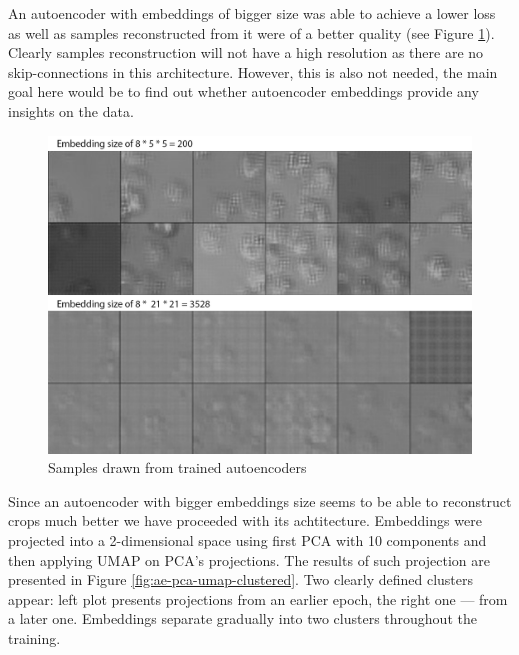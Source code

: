 An autoencoder with embeddings of bigger size was able to achieve a lower loss as well as samples reconstructed from it were of a better quality (see Figure \ref{fig:ae-samples}). Clearly samples reconstruction will not have a high resolution as there are no skip-connections in this architecture. However, this is also not needed, the main goal here would be to find out whether autoencoder embeddings provide any insights on the data.
\begin{figure}[H]
	\begin{center}
		\includegraphics[width=0.5\linewidth]{bilder/ae-embeddings/ae-samples.png}
		\caption{Samples drawn from trained autoencoders}
		\label{fig:ae-samples}
	\end{center}
\end{figure}

Since an autoencoder with bigger embeddings size seems to be able to reconstruct crops much better we have proceeded with its achtitecture. Embeddings were projected into a 2-dimensional space using first PCA with 10 components and then applying UMAP on PCA's projections. The results of such projection are presented in Figure \ref{fig:ae-pca-umap-clustered}. Two clearly defined clusters appear: left plot presents projections from an earlier epoch, the right one --- from a later one. Embeddings separate gradually into two clusters throughout the training.

